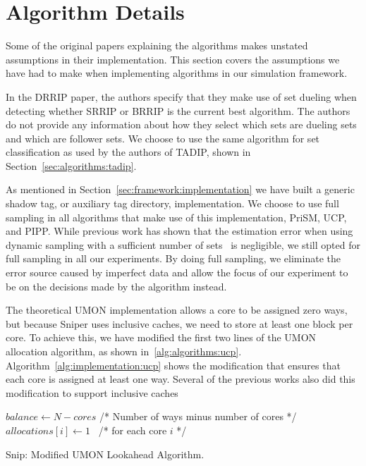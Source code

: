 \section{Algorithm Details}
\label{sec:framework:algorithms}

Some of the original papers explaining the algorithms makes unstated assumptions in their implementation.
This section covers the assumptions we have had to make when implementing algorithms in our simulation framework.

In the DRRIP paper, the authors specify that they make use of set dueling when detecting whether SRRIP or BRRIP is the current best algorithm.
The authors do not provide any information about how they select which sets are dueling sets and which are follower sets.
We choose to use the same algorithm for set classification as used by the authors of TADIP, shown in Section~\ref{sec:algorithms:tadip}.

As mentioned in Section~\ref{sec:framework:implementation} we have built a generic shadow tag, or auxiliary tag directory, implementation.
We choose to use full sampling in all algorithms that make use of this implementation, PriSM, UCP, and PIPP.
While previous work has shown that the estimation error when using dynamic sampling with a sufficient number of sets~\cite{} is negligible, we still opted for full sampling in all our experiments.
By doing full sampling, we eliminate the error source caused by imperfect data and allow the focus of our experiment to be on the decisions made by the algorithm instead.

The theoretical UMON implementation allows a core to be assigned zero ways, but because Sniper uses inclusive caches, we need to store at least one block per core.
To achieve this, we have modified the first two lines of the UMON allocation algorithm, as shown in~\ref{alg:algorithms:ucp}.
Algorithm~\ref{alg:implementation:ucp} shows the modification that ensures that each core is assigned at least one way.
Several of the previous works also did this modification to support inclusive caches~\cite{Qureshi2006,Xie2009}

\begin{algorithm}[ht]
\begin{algorithmic}[1]
\State $balance\gets N - cores $ /* Number of ways minus number of cores */
\State $allocations[i]\gets 1$  /* for each core $i$ */
\end{algorithmic}
\caption{Snip: Modified UMON Lookahead Algorithm.}
\label{alg:implementation:ucp}
\end{algorithm}

